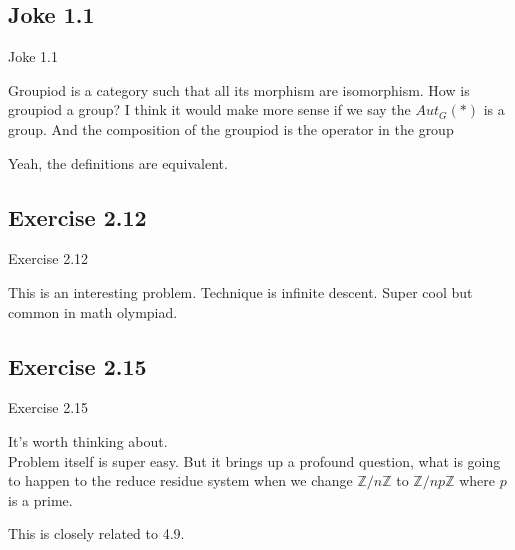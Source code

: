 \documentclass[15pt]{scrartcl}
\begin{document}
\subsection{Joke 1.1 }
\begin{discussion*}Joke 1.1 
    \begin{abboy*}
    Groupiod is a category such that all its morphism are isomorphism. How is groupiod a group? I think it would make more sense if we say the $Aut_G(*)$ is a group. And the composition of the groupiod is the operator in the group
    \end{abboy*}
    
    \begin{evie*}
    Yeah, the definitions are equivalent.
    \end{evie*}
\end{discussion*}


\subsection{Exercise 2.12}
\begin{discussion*}Exercise 2.12
    \begin{abboy*}
    This is an interesting problem. Technique is infinite descent. Super cool but common in math olympiad.
    \end{abboy*}
\end{discussion*}


\subsection{Exercise 2.15}
\begin{discussion*}Exercise 2.15
    \begin{abboy*}
        It's worth thinking about.
        \\
        Problem itself is super easy. But it brings up a profound question, what is going to happen to the reduce residue system when we change $\mathbb{Z}/n\mathbb{Z}$ to $\mathbb{Z}/np \mathbb{Z}$ where $p$ is a prime.
    \end{abboy*}
    \begin{evie*}
        This is closely related to 4.9.
    \end{evie*}
\end{discussion*}
\end{document}
